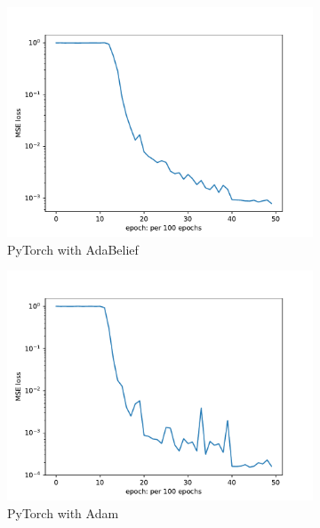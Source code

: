 \documentclass[10pt,journal,compsoc,onecolumn]{IEEEtran}
\begin{document}
\begin{figure}[htbp]
\begin{subfigure}[b]{0.45\textwidth}
        \includegraphics[width=\textwidth]{../../results/pytorch/low-frequency-adabelief-20250206-1600-2/loss}
        \caption{PyTorch with AdaBelief}
    \end{subfigure}
    \begin{subfigure}[b]{0.45\textwidth}
        \includegraphics[width=\textwidth]{../../results/pytorch/low-frequency-adam-20250206-1600-4/loss}
        \caption{PyTorch with Adam}
    \end{subfigure}
    \begin{subfigure}[b]{0.45\textwidth}

\end{subfigure}
\end{figure}
\end{document}
